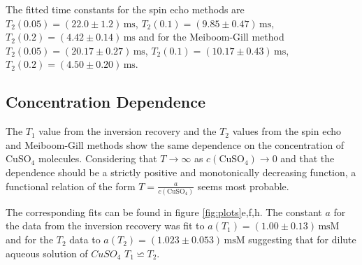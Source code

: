 \documentclass[a4paper]{scrartcl}
\numberwithin{equation}{section}
\numberwithin{figure}{section}
\numberwithin{table}{section}
\begin{document}
The fitted time constants for the spin echo methods are $T_2(0.05)=(22.0\pm 1.2)\,\text{ms}$, $T_2(0.1)=(9.85\pm 0.47)\,\text{ms}$, $T_2(0.2)=(4.42\pm 0.14)\,\text{ms}$ and for the Meiboom-Gill method $T_2(0.05)=(20.17\pm 0.27)\,\text{ms}$, $T_2(0.1)=(10.17\pm 0.43)\,\text{ms}$, $T_2(0.2)=(4.50\pm 0.20)\,\text{ms}$.

\subsection{Concentration Dependence}
The $T_1$ value from the inversion recovery and the $T_2$ values from the spin echo and Meiboom-Gill methods show the same dependence on the concentration of CuSO$_4$ molecules. Considering that $T\rightarrow\infty$ as $c(\text{CuSO}_4)\rightarrow 0$ and that the dependence should be a strictly positive and monotonically decreasing function, a functional relation of the form $T=\frac{a}{c(\text{CuSO}_4)}$ seems most probable.

The corresponding fits can be found in figure \ref{fig:plots}e,f,h. The constant $a$ for the data from the inversion recovery was fit to $a(T_1)=(1.00\pm 0.13)\,\text{msM}$ and for the $T_2$ data to $a(T_2)=(1.023\pm 0.053)\,\text{msM}$ suggesting that for dilute aqueous solution of $CuSO_4$ $T_1\backsimeq T_2$.
\end{document}
